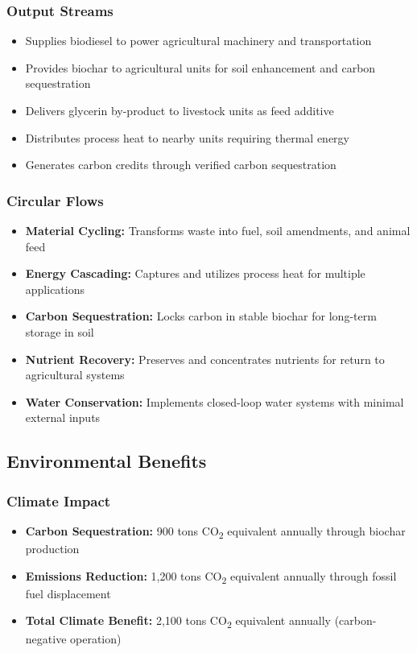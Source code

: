 \subsubsection{Output Streams}
\begin{itemize}
    \item Supplies biodiesel to power agricultural machinery and transportation
    \item Provides biochar to agricultural units for soil enhancement and carbon sequestration
    \item Delivers glycerin by-product to livestock units as feed additive
    \item Distributes process heat to nearby units requiring thermal energy
    \item Generates carbon credits through verified carbon sequestration
\end{itemize}

\subsubsection{Circular Flows}
\begin{itemize}
    \item \textbf{Material Cycling:} Transforms waste into fuel, soil amendments, and animal feed
    \item \textbf{Energy Cascading:} Captures and utilizes process heat for multiple applications
    \item \textbf{Carbon Sequestration:} Locks carbon in stable biochar for long-term storage in soil
    \item \textbf{Nutrient Recovery:} Preserves and concentrates nutrients for return to agricultural systems
    \item \textbf{Water Conservation:} Implements closed-loop water systems with minimal external inputs
\end{itemize}

\subsection{Environmental Benefits}

\subsubsection{Climate Impact}
\begin{itemize}
    \item \textbf{Carbon Sequestration:} 900 tons CO\textsubscript{2} equivalent annually through biochar production
    \item \textbf{Emissions Reduction:} 1,200 tons CO\textsubscript{2} equivalent annually through fossil fuel displacement
    \item \textbf{Total Climate Benefit:} 2,100 tons CO\textsubscript{2} equivalent annually (carbon-negative operation)
\end{itemize}

